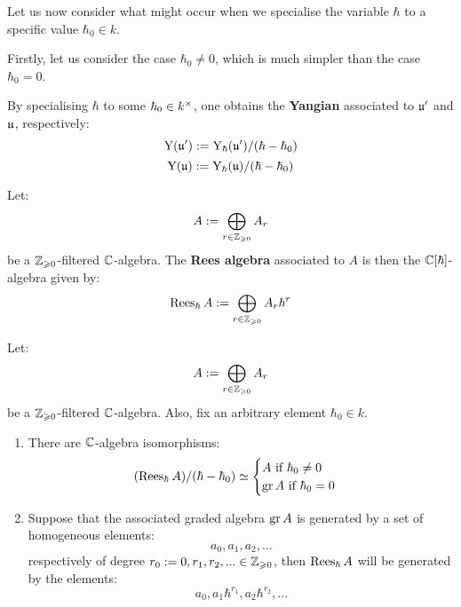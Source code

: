         Let us now consider what might occur when we specialise the variable $\hbar$ to a specific value $\hbar_0 \in k$.

        Firstly, let us consider the case $\hbar_0 \not = 0$, which is much simpler than the case $\hbar_0 = 0$. 
        \begin{definition} \label{def: yangians_associated_to_symmetrisable_kac_moody_algebras}
            By specialising $\hbar$ to some $\hbar_0 \in k^{\x}$, one obtains the \textbf{Yangian} associated to $\mathfrak{u}'$ and $\mathfrak{u}$, respectively:
                $$\mathrm{Y}(\mathfrak{u}') := \mathrm{Y}_{\hbar}(\mathfrak{u}')/(\hbar - \hbar_0)$$
                $$\mathrm{Y}(\mathfrak{u}) := \mathrm{Y}_{\hbar}(\mathfrak{u})/(\hbar - \hbar_0)$$
        \end{definition}
        \begin{definition} \label{def: rees_algebras}
            Let:
                $$A := \bigoplus_{r \in \mathbb{Z}_{\geqslant 0}} A_r$$
            be a $\mathbb{Z}_{\geqslant 0}$-filtered $\mathbb{C}$-algebra. The \textbf{Rees algebra} associated to $A$ is then the $\mathbb{C}[\hbar]$-algebra given by:
                $$\operatorname{Rees}_{\hbar} A := \bigoplus_{r \in \mathbb{Z}_{\geqslant 0}} A_r \hbar^r$$
        \end{definition}
        \begin{lemma} \label{lemma: basic_properties_of_rees_algebras}
            \cite[Exercise I.9.5]{kassel_quantum_groups} Let:
                $$A := \bigoplus_{r \in \mathbb{Z}_{\geqslant 0}} A_r$$
            be a $\mathbb{Z}_{\geqslant 0}$-filtered $\mathbb{C}$-algebra. Also, fix an arbitrary element $\hbar_0 \in k$.
            \begin{enumerate}
                \item There are $\mathbb{C}$-algebra isomorphisms:
                    $$
                        (\operatorname{Rees}_{\hbar} A)/(\hbar - \hbar_0) \simeq
                        \begin{cases}
                            \text{$A$ if $\hbar_0 \not = 0$}
                            \\
                            \text{$\operatorname{gr} A$ if $\hbar_0 = 0$}
                        \end{cases}
                    $$
                \item Suppose that the associated graded algebra $\operatorname{gr} A$ is generated by a set of homogeneous elements:
                    $$a_0, a_1, a_2, ...$$
                respectively of degree $r_0 := 0, r_1, r_2, ... \in \mathbb{Z}_{\geqslant 0}$, then $\operatorname{Rees}_{\hbar} A$ will be generated by the elements:
                    $$a_0, a_1 \hbar^{r_1}, a_2 \hbar^{r_2}, ...$$
            \end{enumerate}
        \end{lemma}
